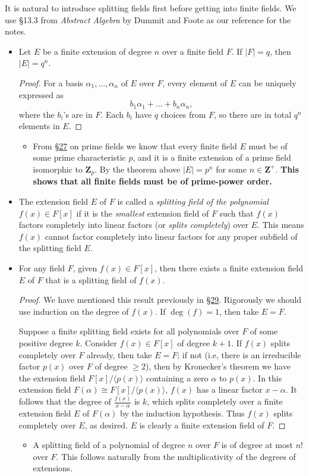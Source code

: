 \documentclass[11pt]{article}
\newcommand{\lk}[2]{\hyperlink{subsection.#1.#2}{\S#2}} %
\newcommand{\Z}{\mathbf{Z}}
\newcommand{\df}[1]{\textit{\textsf{#1}}}
\newcommand{\la}{\langle}
\newcommand{\ra}{\rangle}
\newcommand{\abs}[1]{\lvert #1 \rvert}
\renewcommand{\simeq}{\cong}
\begin{document}
It is natural to introduce splitting fields first before getting into finite fields. We use \S13.3 from \textit{Abstract Algebra} by Dummit and Foote as our reference for the notes.
\begin{itemize}
    \item Let $E$ be a finite extension of degree $n$ over a finite field $F$. If $\abs{F} = q$, then $\abs{E} = q^n$.
    \begin{proof}
        For a basis $\alpha_1,\dots,\alpha_n$ of $E$ over $F$, every element of $E$ can be uniquely expressed as \[b_1\alpha_1 + \dots + b_n\alpha_n,\] where the $b_i$'s are in $F$. Each $b_i$ have $q$ choices from $F$, so there are in total $q^n$ elements in $E$.
    \end{proof}
    \begin{itemize}
        \item From \lk{5}{27} on prime fields we know that every finite field $E$ must be of some prime characteristic $p$, and it is a finite extension of a prime field isomorphic to $\Z_p$. By the theorem above $\abs{E} = p^n$ for some $n \in \Z^+$. \textbf{This shows that all finite fields must be of prime-power order.}
    \end{itemize}
    \item The extension field $E$ of $F$ is called a \df{splitting field of the polynomial $f(x) \in F[x]$} if it is the \emph{smallest} extension field of $F$ such that $f(x)$ factors completely into linear factors (or \df{splits completely}) over $E$. This means $f(x)$ cannot factor completely into linear factors for any proper subfield of the splitting field $E$.
    \item For any field $F$, given $f(x) \in F[x]$, then there exists a finite extension field $E$ of $F$ that is a splitting field of $f(x)$.
    \begin{proof}
        We have mentioned this result previously in \lk{6}{29}. Rigorously we should use induction on the degree of $f(x)$. If $\deg(f) = 1$, then take $E = F$.
        
        Suppose a finite splitting field exists for all polynomials over $F$ of some positive degree $k$. Consider $f(x) \in F[x]$ of degree $k+1$. If $f(x)$ splits completely over $F$ already, then take $E = F$; if not (i.e, there is an irreducible factor $p(x)$ over $F$ of degree $\geq 2$), then by Kronecker's theorem we have the extension field $F[x]/\la p(x) \ra$ containing a zero $\alpha$ to $p(x)$. In this extension field $F(\alpha) \simeq F[x]/\la p(x) \ra$, $f(x)$ has a linear factor $x - \alpha$. It follows that the degree of $\frac{f(x)}{x-\alpha}$ is $k$, which splits completely over a finite extension field $E$ of $F(\alpha)$ by the induction hypothesis. Thus $f(x)$ splits completely over $E$, as desired. $E$ is clearly a finite extension field of $F$.
    \end{proof}
    \begin{itemize}
        \item A splitting field of a polynomial of degree $n$ over $F$ is of degree at most $n!$ over $F$. This follows naturally from the multiplicativity of the degrees of extensions. 
    \end{itemize}
    

\end{itemize}
\end{document}
